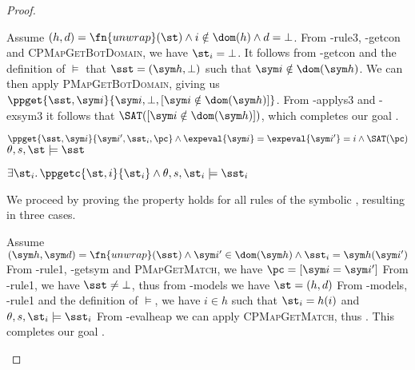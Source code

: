 \begin{proof}
\begin{hypvlist}
 Assume $(h,d)=\fn{unwrap}(\st) \land i\notin\dom(h) \land d=\bot$.
 From \hyp{rule3}, \hyp{getcon} and \textsc{CPMapGetBotDomain}, we have $\st_i=\bot$.
 It follows from \hyp{getcon} and the definition of $\models$ that $\sst=(\sym h, \bot)$ such that $\sym i\notin \dom(\sym h)$.
 We can then apply \textsc{PMapGetBotDomain}, giving us $\ppget{\sst,\sym i}{\sym i,\bot,[\sym i\notin \dom(\sym h)]}$.%
 From \hyp{applys3} and \hyp{exsym3} it follows that $\SAT([\sym i\notin \dom(\sym h)])$, which completes our goal .
\end{hypvlist}


\pfassume \begin{hypvlist}
 $\ppget{\sst,\sym i}{\sym i', \sst_i, \pc} \land \expeval{\sym i}=\expeval{\sym i'}=i \land \SAT(\pc)$
 $\theta,s,\st\models\sst$
\end{hypvlist}
\pfprove \begin{goalvlist}
 $\exists \st_i \ldotp \ppgetc{\st, i}{\st_i} \land \theta,s,\st_i \models \sst_i$
\end{goalvlist}

We proceed by proving the property holds for all rules of the symbolic , resulting in three cases.


\begin{hypvlist}
 Assume $(\sym h,\sym d)=\fn{unwrap}(\sst) \land \sym i'\in\dom(\sym h) \land \sst_i=\sym h(\sym i')$
 From \hyp{rule1}, \hyp{getsym} and \textsc{PMapGetMatch}, we have $\pc=[\sym i=\sym i']$
 From \hyp{rule1}, we have $\sst\neq\bot$, thus from \hyp{models} we have $\st=(h, d)$
 From \hyp{models}, \hyp{rule1} and the definition of $\models$, we have $i\in h$ such that $\st_i=h(i)$ and ${\theta,s,\st_i\models\sst_i}$
 From \hyp{evalheap} we can apply \textsc{CPMapGetMatch}, thus . This completes our goal .
\end{hypvlist}



\end{proof}
